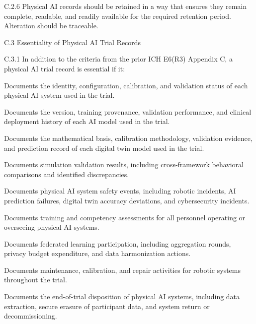 \documentclass[11pt]{article}
\begin{document}
C.2.6 Physical AI records should be retained in a way that ensures they remain complete, readable, and readily available for the required retention period. Alteration should be traceable.

C.3 Essentiality of Physical AI Trial Records

C.3.1 In addition to the criteria from the prior ICH E6(R3) Appendix C, a physical AI trial record is essential if it:

\begin{description}[leftmargin=2.5cm,style=sameline]

\item[(a)] Documents the identity, configuration, calibration, and validation status of each physical AI system used in the trial.

\item[(b)] Documents the version, training provenance, validation performance, and clinical deployment history of each AI model used in the trial.

\item[(c)] Documents the mathematical basis, calibration methodology, validation evidence, and prediction record of each digital twin model used in the trial.

\item[(d)] Documents simulation validation results, including cross-framework behavioral comparisons and identified discrepancies.

\item[(e)] Documents physical AI system safety events, including robotic incidents, AI prediction failures, digital twin accuracy deviations, and cybersecurity incidents.

\item[(f)] Documents training and competency assessments for all personnel operating or overseeing physical AI systems.

\item[(g)] Documents federated learning participation, including aggregation rounds, privacy budget expenditure, and data harmonization actions.

\item[(h)] Documents maintenance, calibration, and repair activities for robotic systems throughout the trial.

\item[(i)] Documents the end-of-trial disposition of physical AI systems, including data extraction, secure erasure of participant data, and system return or decommissioning.

\end{description}
\end{document}
